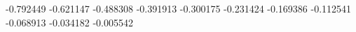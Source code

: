 -0.792449
-0.621147
-0.488308
-0.391913
-0.300175
-0.231424
-0.169386
-0.112541
-0.068913
-0.034182
-0.005542
